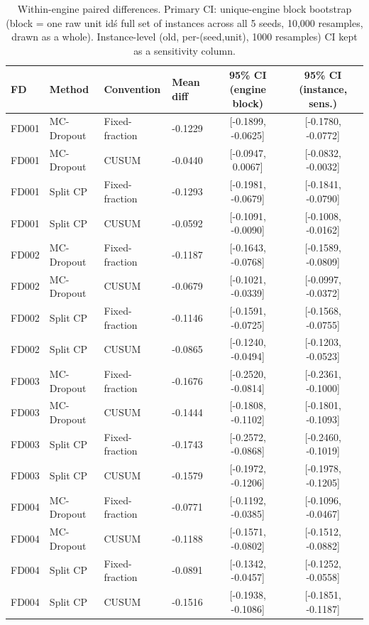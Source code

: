 \begin{table}[t]
\caption{Within-engine paired differences. Primary CI: unique-engine block bootstrap (block = one raw unit id\'s full set of instances across all 5 seeds, 10{,}000 resamples, drawn as a whole). Instance-level (old, per-(seed,unit), 1000 resamples) CI kept as a sensitivity column.}
\label{tab:paired-diff-v3}
\centering
\small
\begin{tabular}{llllcc}
\toprule
FD & Method & Convention & Mean diff & 95\% CI (engine block) & 95\% CI (instance, sens.) \\
\midrule
FD001 & MC-Dropout & Fixed-fraction & -0.1229 & [-0.1899, -0.0625] & [-0.1780, -0.0772] \\
FD001 & MC-Dropout & CUSUM & -0.0440 & [-0.0947, 0.0067] & [-0.0832, -0.0032] \\
FD001 & Split CP & Fixed-fraction & -0.1293 & [-0.1981, -0.0679] & [-0.1841, -0.0790] \\
FD001 & Split CP & CUSUM & -0.0592 & [-0.1091, -0.0090] & [-0.1008, -0.0162] \\
FD002 & MC-Dropout & Fixed-fraction & -0.1187 & [-0.1643, -0.0768] & [-0.1589, -0.0809] \\
FD002 & MC-Dropout & CUSUM & -0.0679 & [-0.1021, -0.0339] & [-0.0997, -0.0372] \\
FD002 & Split CP & Fixed-fraction & -0.1146 & [-0.1591, -0.0725] & [-0.1568, -0.0755] \\
FD002 & Split CP & CUSUM & -0.0865 & [-0.1240, -0.0494] & [-0.1203, -0.0523] \\
FD003 & MC-Dropout & Fixed-fraction & -0.1676 & [-0.2520, -0.0814] & [-0.2361, -0.1000] \\
FD003 & MC-Dropout & CUSUM & -0.1444 & [-0.1808, -0.1102] & [-0.1801, -0.1093] \\
FD003 & Split CP & Fixed-fraction & -0.1743 & [-0.2572, -0.0868] & [-0.2460, -0.1019] \\
FD003 & Split CP & CUSUM & -0.1579 & [-0.1972, -0.1206] & [-0.1978, -0.1205] \\
FD004 & MC-Dropout & Fixed-fraction & -0.0771 & [-0.1192, -0.0385] & [-0.1096, -0.0467] \\
FD004 & MC-Dropout & CUSUM & -0.1188 & [-0.1571, -0.0802] & [-0.1512, -0.0882] \\
FD004 & Split CP & Fixed-fraction & -0.0891 & [-0.1342, -0.0457] & [-0.1252, -0.0558] \\
FD004 & Split CP & CUSUM & -0.1516 & [-0.1938, -0.1086] & [-0.1851, -0.1187] \\
\bottomrule
\end{tabular}
\end{table}
